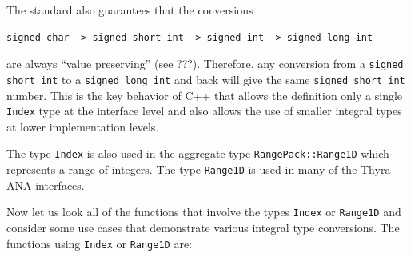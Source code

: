 \documentclass[pdf,ps2pdf,11pt]{SANDreport}
\begin{document}
The standard also guarantees that the conversions
%
{\scriptsize\begin{verbatim}
signed char -> signed short int -> signed int -> signed long int
\end{verbatim}}
%
{}\noindent{}are always ``value preserving'' (see ???).  Therefore, any
conversion from a {}\texttt{signed short int} to a {}\texttt{signed long int}
and back will give the same {}\texttt{signed short int} number.  This is the
key behavior of C++ that allows the definition only a single {}\texttt{Index}
type at the interface level and also allows the use of smaller integral types
at lower implementation levels.

The type {}\texttt{Index} is also used in the aggregate type
{}\texttt{Range\-Pack\-::Range1D} which represents a range of integers.  The
type {}\texttt{Range1D} is used in many of the Thyra ANA interfaces.

Now let us look all of the functions that involve the types {}\texttt{Index}
or {}\texttt{Range1D} and consider some use cases that demonstrate various
integral type conversions.  The functions using {}\texttt{Index} or
{}\texttt{Range1D} are:
\end{document}
